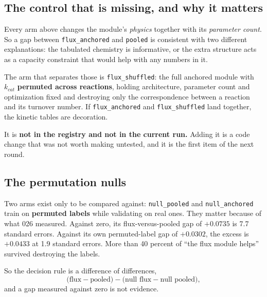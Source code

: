 \subsection{The control that is missing, and why it matters}

Every arm above changes the module's \emph{physics} together with its \emph{parameter
count}. So a gap between \texttt{flux\_anchored} and \texttt{pooled} is consistent with two
different explanations: the tabulated chemistry is informative, or the extra structure acts
as a capacity constraint that would help with any numbers in it.

The arm that separates those is \texttt{flux\_shuffled}: the full anchored module with
$k_{cat}$ \textbf{permuted across reactions}, holding architecture, parameter count and
optimization fixed and destroying only the correspondence between a reaction and its
turnover number. If \texttt{flux\_anchored} and \texttt{flux\_shuffled} land together, the
kinetic tables are decoration.

It is \textbf{not in the registry and not in the current run.} Adding it is a code change
that was not worth making untested, and it is the first item of the next round.

\subsection{The permutation nulls}

Two arms exist only to be compared against: \texttt{null\_pooled} and
\texttt{null\_anchored} train on \textbf{permuted labels} while validating on real ones.
They matter because of what 026 measured. Against zero, its flux-versus-pooled gap of
$+0.0735$ is 7.7 standard errors. Against its own permuted-label gap of $+0.0302$, the
excess is $+0.0433$ at 1.9 standard errors. More than 40 percent of ``the flux module
helps'' survived destroying the labels.

So the decision rule is a difference of differences,
\begin{equation}
  \big(\text{flux} - \text{pooled}\big) - \big(\text{null flux} - \text{null pooled}\big),
\end{equation}
and a gap measured against zero is not evidence.
